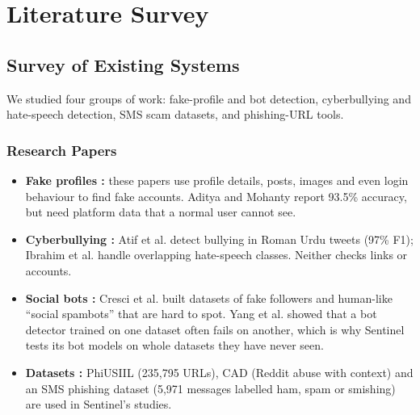 
\onehalfspacing

\pagestyle{fancy}
\fancyhf{}
\renewcommand{\headrulewidth}{0pt}
\cfoot{\thepage}
\chapter{Literature Survey}

\section{Survey of Existing Systems}
\noindent We studied four groups of work: fake-profile and bot detection, cyberbullying and hate-speech detection, SMS scam datasets, and phishing-URL tools.

\subsection{Research Papers}
\begin{itemize}
\item \textbf{Fake profiles \cite{lit1,lit2,lit3}:} these papers use profile details, posts, images and even login behaviour to find fake accounts. Aditya and Mohanty \cite{lit2} report 93.5\% accuracy, but need platform data that a normal user cannot see.
\item \textbf{Cyberbullying \cite{lit4,lit5}:} Atif et al. \cite{lit4} detect bullying in Roman Urdu tweets (97\% F1); Ibrahim et al. \cite{lit5} handle overlapping hate-speech classes. Neither checks links or accounts.
\item \textbf{Social bots \cite{cresci2015,cresci2017,yang2020}:} Cresci et al. built datasets of fake followers and human-like ``social spambots'' that are hard to spot. Yang et al. showed that a bot detector trained on one dataset often fails on another, which is why Sentinel tests its bot models on whole datasets they have never seen.
\item \textbf{Datasets \cite{phiusiil,cad,smsdata}:} PhiUSIIL (235,795 URLs), CAD (Reddit abuse with context) and an SMS phishing dataset (5,971 messages labelled ham, spam or smishing) are used in Sentinel's studies.
\end{itemize}

